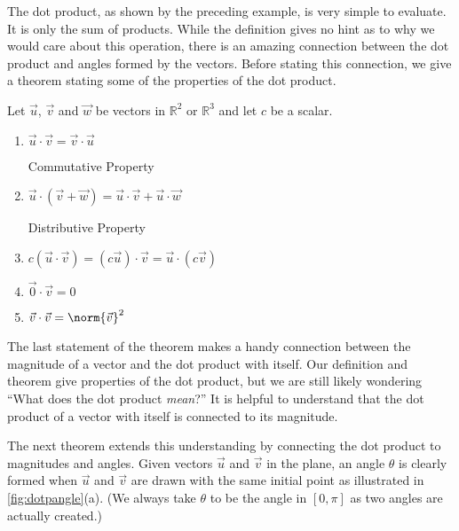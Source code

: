 The dot product, as shown by the preceding example, is very simple to evaluate. It is only the sum of products. While the definition gives no hint as to why we would care about this operation, there is an amazing connection between the dot product and angles formed by the vectors. Before stating this connection, we give a theorem stating some of the properties of the dot product.

\begin{theorem}\label{thm:dot_product_properties}
Let $\vec u$, $\vec v$ and $\vec w$ be vectors in $\mathbb{R}^2$ or $\mathbb{R}^3$ and let $c$ be a scalar.
\begin{enumerate}
	\item \parbox{150pt}{$\vec u\cdot\vec v = \vec v\cdot\vec u$}{Commutative Property}
	\item \parbox{150pt}{$\vec u\cdot(\vec v+\vec w) = \vec u\cdot\vec v + \vec u\cdot\vec w$}{Distributive Property}
	\item	$c(\vec u\cdot\vec v) = (c\vec u)\cdot \vec v = \vec u \cdot (c\vec v)$
	\item	$\vec 0\cdot\vec v = 0$
	\item	$\vec v\cdot\vec v=\norm{\vec v}^2 $
\end{enumerate}
\end{theorem}

The last statement of the theorem makes a handy connection between the magnitude of a vector and the dot product with itself. Our definition and theorem give properties of the dot product, but we are still likely wondering ``What does the dot product \emph{mean}?'' It is helpful to understand that the dot product of a vector with itself is connected to its magnitude.

The next theorem extends this understanding by connecting the dot product to magnitudes and angles. Given vectors $\vec u$ and $\vec v$ in the plane, an angle $\theta$ is clearly formed when $\vec u$ and $\vec v$ are drawn with the same initial point as illustrated in \autoref{fig:dotpangle}(a). (We always take $\theta$ to be the angle in $[0,\pi]$ as two angles are actually created.) 


